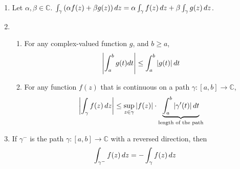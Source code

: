 \documentclass[notoc,notitlepage]{tufte-book}
\begin{document}
\begin{propo}\label{propo:properties_of_integrals_in_c}
	\begin{enumerate}
		\item {} Let $\alpha, \beta \in \mathbb{C}$. $\int_{\gamma} \left(\alpha f(z) + \beta g(z) \right) \mathop{}\!d{z} = \alpha \int_{\gamma} f(z) \mathop{}\!d{z} + \beta \int_{\gamma} g(z) \mathop{}\!d{z}$. \label{item:linearity_property_of_integrals}
		\item \begin{enumerate}
			\item For any complex-valued function $g$, and $b \geq a$,
				\begin{equation*}
					\left|\int_{a}^{b} g(t) dt\right| \leq \int_{a}^{b} \left|g(t)\right| dt
				\end{equation*} \label{item:absval_integral_less_than_integral_absval}
			\item For any function $f(z)$ that is continuous on a path $\gamma: [a, b] \to \mathbb{C}$,
					\begin{equation*}
						\left|\int_{\gamma} f(z) \mathop{}\!d{z}\right| \leq \sup_{z \in \gamma} \left|f(z)\right| \cdot \underbrace{\int_{a}^{b} \left|\gamma'(t)\right| dt}_{\text{length of the path}}
					\end{equation*}\label{item:absval_integral_less_than_fnsup_times_arc_length}
		\end{enumerate}
		\item If $\gamma^-$ is the path $\gamma: [a, b] \to \mathbb{C}$ with a reversed direction, then
			\begin{equation*}
				\int_{\gamma^-} f(z) \mathop{}\!d{z} = - \int_{\gamma} f(z) \mathop{}\!d{z}
			\end{equation*}\label{item:reversed_path_orientation_gives_negative_integral}
	\end{enumerate}
\end{propo}
\end{document}
